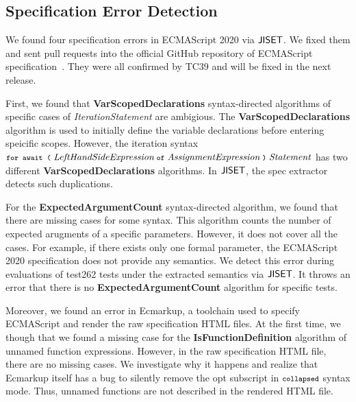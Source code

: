 
\subsection{Specification Error Detection}

We found four specification errors in ECMAScript 2020 via \( \text{\sf JISET} \).
We fixed them and sent pull requests into the official GitHub repository of
ECMAScript specification~\cite{es2020}. They were all confirmed by TC39
and will be fixed in the next release.

First, we found that \textbf{VarScopedDeclarations} syntax-directed algorithms of
specific cases of \textit{IterationStatement} are ambigious.
The \textbf{VarScopedDeclarations} algorithm is used to initially define
the variable declarations before entering speicific scopes. However, the iteration syntax
\( \texttt{\footnotesize for await (} \; \textit{LeftHandSideExpression} \; \texttt{\footnotesize of} \;
\textit{AssignmentExpression} \; \texttt{\footnotesize)} \; \textit{Statement} \)
has two different \textbf{VarScopedDeclarations} algorithms.
In \( \text{\sf JISET} \), the spec extractor detects such duplications.

For the \textbf{ExpectedArgumentCount} syntax-directed algorithm, we found that
there are missing cases for some syntax. This algorithm counts the number of
expected arugments of a specific parameters. However, it does not cover all
the cases. For example, if there exists only one formal parameter,
the ECMAScript 2020 specification does not provide any semantics.
We detect this error during evaluations of test262 tests under
the extracted semantics via \( \text{\sf JISET} \). It throws an error that there
is no \textbf{ExpectedArgumentCount} algorithm for specific tests.

Moreover, we found an error in \textsf{Ecmarkup}, a toolchain used to specify ECMAScript
and render the raw specification HTML files.
At the first time, we though that we found a missing case for the \textbf{IsFunctionDefinition}
algorithm of unnamed function expressions. However, in the raw specification HTML file,
there are no missing cases. We investigate why it happens and realize that \textsf{Ecmarkup}
itself has a bug to silently remove the {\small opt} subscript in
\( \texttt{\footnotesize collapsed} \) syntax mode. Thus, unnamed functions are not described
in the rendered HTML file.

